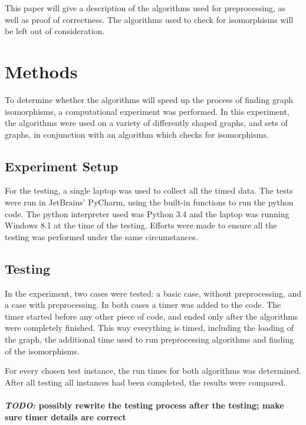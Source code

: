 \documentclass[twoside]{article}
\theoremstyle{definition}
\theoremstyle{plain}
\begin{document}
\begin{multicols}{2}
This paper will give a description of the algorithms used for preprocessing, as well as proof of correctness. The algorithms used to check for isomorphisms will be left out of consideration.

\section{Methods}
To determine whether the algorithms will speed up the process of finding graph isomorphisms, a computational experiment was performed. In this experiment, the algorithms were used on a variety of differently shaped graphs, and sets of graphs, in conjunction with an algorithm which checks for isomorphisms.

\subsection{Experiment Setup}
For the testing, a single laptop was used to collect all the timed data. The tests were run in JetBrains' PyCharm, using the built-in functions to run the python code. The python interpreter used was Python 3.4 and the laptop was running Windows 8.1 at the time of the testing. Efforts were made to ensure all the testing was performed under the same circumstances.

\subsection{Testing}
In the experiment, two cases were tested: a basic case, without preprocessing, and a case with preprocessing. In both cases a timer was added to the code. The timer started before any other piece of code, and ended only after the algorithms were completely finished. This way everything is timed, including the loading of the graph, the additional time used to run preprocessing algorithms and finding of the isomorphisms.

For every chosen test instance, the run times for both algorithms was determined. After all testing all instances had been completed, the results were compared.
\\ \\
\textbf{\emph{TODO:} possibly rewrite the testing process after the testing; make sure timer details are correct}


\end{multicols}
\end{document}

